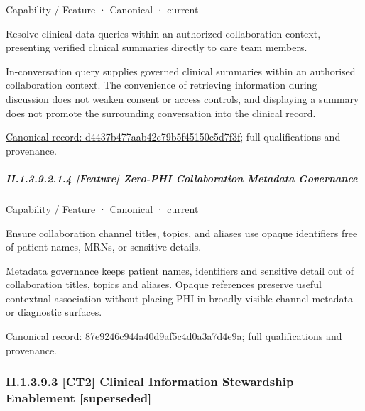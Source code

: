 \label{element:d4437b477aab42c79b5f45150c5d7f3f}
{\small Capability / Feature · Canonical · current}\par

Resolve clinical data queries within an authorized collaboration context, presenting verified clinical summaries directly to care team members.



In-conversation query supplies governed clinical summaries within an authorised collaboration context. The convenience of retrieving information during discussion does not weaken consent or access controls, and displaying a summary does not promote the surrounding conversation into the clinical record.


{\footnotesize \href{../../../../../../../continuum/strategy/capability/feature/d4437b477aab42c79b5f45150c5d7f3f.md}{Canonical record: d4437b477aab42c79b5f45150c5d7f3f}; full qualifications and provenance.}\par
\subparagraph*{II.1.3.9.2.1.4 [Feature] Zero-PHI Collaboration Metadata Governance}
\label{navigation:II.1.3.9.2.1.4}

\label{element:87e9246c944a40d9af5c4d0a3a7d4e9a}
{\small Capability / Feature · Canonical · current}\par

Ensure collaboration channel titles, topics, and aliases use opaque identifiers free of patient names, MRNs, or sensitive details.



Metadata governance keeps patient names, identifiers and sensitive detail out of collaboration titles, topics and aliases. Opaque references preserve useful contextual association without placing PHI in broadly visible channel metadata or diagnostic surfaces.


{\footnotesize \href{../../../../../../../continuum/strategy/capability/feature/87e9246c944a40d9af5c4d0a3a7d4e9a.md}{Canonical record: 87e9246c944a40d9af5c4d0a3a7d4e9a}; full qualifications and provenance.}\par
\subsubsection*{II.1.3.9.3 [CT2] Clinical Information Stewardship Enablement [superseded]}
\label{navigation:II.1.3.9.3}

